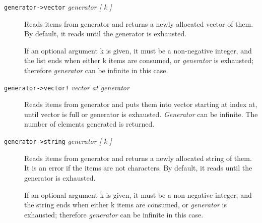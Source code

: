 \begin{description}
\item[\texttt{generator-\textgreater{}vector} \emph{generator {[} k
{]}}]
Reads items from generator and returns a newly allocated vector of them.
By default, it reads until the generator is exhausted.

If an optional argument k is given, it must be a non-negative integer,
and the list ends when either k items are consumed, or \emph{generator}
is exhausted; therefore \emph{generator} can be infinite in this case.
\end{description}

\begin{description}
\item[\texttt{generator-\textgreater{}vector!} \emph{vector at
generator}]
Reads items from generator and puts them into vector starting at index
at, until vector is full or generator is exhausted. \emph{Generator} can
be infinite. The number of elements generated is returned.
\end{description}

\begin{description}
\item[\texttt{generator-\textgreater{}string} \emph{generator {[} k
{]}}]
Reads items from generator and returns a newly allocated string of them.
It is an error if the items are not characters. By default, it reads
until the generator is exhausted.

If an optional argument k is given, it must be a non-negative integer,
and the string ends when either k items are consumed, or
\emph{generator} is exhausted; therefore \emph{generator} can be
infinite in this case.
\end{description}

